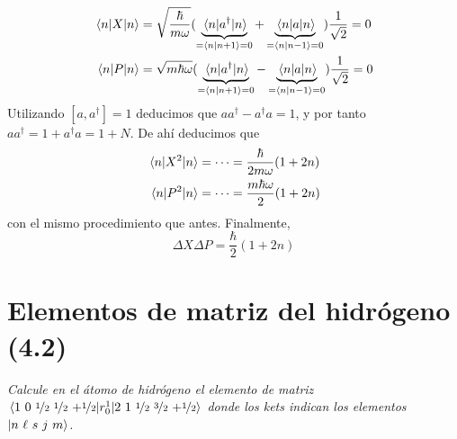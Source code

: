 \begin{align}
  \mel{n}{X}{n} &= \sqrt{\frac{\hbar}{m\omega}} ( \underbrace{\mel{n}{a^\dagger}{n}}_{{=\braket{n}{n+1}=0}}
  + \underbrace{\mel{n}{a}{n}}_{=\braket{n}{n-1}=0})
  \frac{1}{\sqrt{2}} = 0 \\
  \mel{n}{P}{n} &= \sqrt{m \hbar\omega} ( \underbrace{\mel{n}{a^\dagger}{n}}_{{=\braket{n}{n+1}=0}}
  - \underbrace{\mel{n}{a}{n}}_{=\braket{n}{n-1}=0})
  \frac{1}{\sqrt{2}} = 0 
\end{align}
Utilizando $[a,a^\dagger]=1$ deducimos que $aa^\dagger-a^\dagger a =
1$, y por tanto $a a^\dagger = 1 + a^\dagger a = 1 + N$. De ahí
deducimos que
\begin{align}
  \mel{n}{X^2}{n} &= \cdots = \frac{\hbar}{2m\omega}(1+2n)\\
  \mel{n}{P^2}{n} &= \cdots = \frac{m\hbar\omega}{2}(1+2n)
\end{align}
con el mismo procedimiento que antes. Finalmente,
\begin{equation}
  \Delta X \Delta P = \frac{\hbar}{2}(1+2n)
\end{equation}

\chapter{Elementos de matriz del hidrógeno (4.2)}
\label{ej:integralloca}
\begin{tcolorbox}[halign=left]
  \emph{Calcule en el átomo de hidrógeno el elemento de matriz 
    $\mel*{1\  0 \ \oh \ \oh \ {+\oh}}{r_0^1}{2\ 1  \ {\oh} \
      {\nicefrac{3}{2}} \ {+\oh}}$ 
  donde los kets indican los elementos $\ket{n\ \ell\ s \ j \ m}$.}
\end{tcolorbox}

